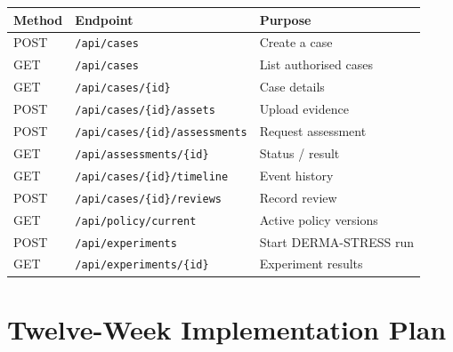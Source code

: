 \documentclass[conference]{IEEEtran}
\newcommand{\1}{\mathbf{1}}
\begin{document}
\begin{table}[H]
  \centering
  \small
  \renewcommand{\arraystretch}{1.15}
  \begin{tabular}{llp{3.6cm}}
    \toprule
    \textbf{Method} & \textbf{Endpoint} & \textbf{Purpose} \\
    \midrule
    POST & \texttt{/api/cases} & Create a case \\
    GET  & \texttt{/api/cases} & List authorised cases \\
    GET  & \texttt{/api/cases/\{id\}} & Case details \\
    POST & \texttt{/api/cases/\{id\}/assets} & Upload evidence \\
    POST & \texttt{/api/cases/\{id\}/assessments} & Request assessment \\
    GET  & \texttt{/api/assessments/\{id\}} & Status / result \\
    GET  & \texttt{/api/cases/\{id\}/timeline} & Event history \\
    POST & \texttt{/api/cases/\{id\}/reviews} & Record review \\
    GET  & \texttt{/api/policy/current} & Active policy versions \\
    POST & \texttt{/api/experiments} & Start DERMA-STRESS run \\
    GET  & \texttt{/api/experiments/\{id\}} & Experiment results \\
    \bottomrule
  \end{tabular}
\end{table}

\section{Twelve-Week Implementation Plan}
\label{app:plan}
\end{document}
